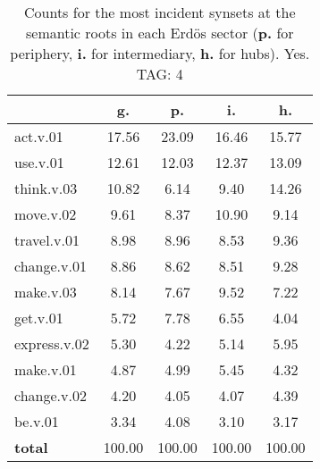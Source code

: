 \begin{table}[h!]
\begin{center}
\begin{tabular}{| l || c | c | c | c |}\hline
 & {\bf g.} & {\bf p.} & {\bf i.} & {\bf h.} \\\hline\hline
act.v.01 & 17.56  & 23.09  & 16.46  & 15.77 \\\hline
use.v.01 & 12.61  & 12.03  & 12.37  & 13.09 \\\hline
think.v.03 & 10.82  & 6.14  & 9.40  & 14.26 \\\hline
move.v.02 & 9.61  & 8.37  & 10.90  & 9.14 \\\hline
travel.v.01 & 8.98  & 8.96  & 8.53  & 9.36 \\\hline
change.v.01 & 8.86  & 8.62  & 8.51  & 9.28 \\\hline
make.v.03 & 8.14  & 7.67  & 9.52  & 7.22 \\\hline
get.v.01 & 5.72  & 7.78  & 6.55  & 4.04 \\\hline
express.v.02 & 5.30  & 4.22  & 5.14  & 5.95 \\\hline
make.v.01 & 4.87  & 4.99  & 5.45  & 4.32 \\\hline
change.v.02 & 4.20  & 4.05  & 4.07  & 4.39 \\\hline
be.v.01 & 3.34  & 4.08  & 3.10  & 3.17 \\\hline\hline
{{\bf total}} & 100.00  & 100.00  & 100.00  & 100.00 \\\hline
\end{tabular}
\caption{Counts for the most incident synsets at the semantic roots in each Erd\"os sector ({\bf p.} for periphery, {\bf i.} for intermediary, {\bf h.} for hubs). Yes. TAG: 4}
\end{center}
\end{table}